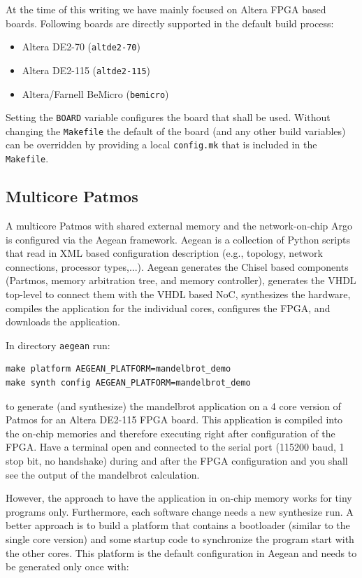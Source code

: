 \documentclass[a4paper,fontsize=10pt,twoside,DIV15,BCOR12mm,headinclude=true,footinclude=false,pagesize,bibtotoc]{scrbook}
\newcommand{\code}[1]{{\texttt{#1}}}
\begin{document}
At the time of this writing we have mainly focused on Altera FPGA based boards. Following boards
are directly supported in the default build process:

\begin{itemize}
\item Altera DE2-70 (\code{altde2-70})
\item Altera DE2-115 (\code{altde2-115})
\item Altera/Farnell BeMicro (\code{bemicro})
\end{itemize}

Setting the \code{BOARD} variable configures the board that shall be used.
Without changing the \code{Makefile} the default of the board (and any other build variables)
can be overridden by providing a local \code{config.mk} that is included in the \code{Makefile}.

\subsection{Multicore Patmos}

A multicore Patmos with shared external memory and the network-on-chip Argo is configured via
the Aegean framework. Aegean is a collection of Python scripts that read in XML based configuration
description (e.g., topology, network connections, processor types,...). Aegean generates the Chisel based
components (Partmos, memory arbitration tree, and memory controller), generates the VHDL top-level
to connect them with the VHDL based NoC, synthesizes the hardware, compiles the application for the
individual cores, configures the FPGA, and downloads the application.

In directory \code{aegean} run:

\begin{verbatim}
make platform AEGEAN_PLATFORM=mandelbrot_demo
make synth config AEGEAN_PLATFORM=mandelbrot_demo
\end{verbatim}

to generate (and synthesize) the mandelbrot application on a 4 core
version of Patmos for an Altera DE2-115 FPGA board. This application is compiled
into the on-chip memories and therefore executing right after configuration of the
FPGA. Have a terminal open and connected to the serial port (115200 baud, 1 stop bit,
no handshake) during and after the FPGA configuration and you shall see the output of
the mandelbrot calculation.

However, the approach to have the application in on-chip memory works for tiny programs
only. Furthermore, each software change needs a new synthesize run. A better approach is
to build a platform that contains a bootloader (similar to the single core version) and some
startup code to synchronize the program start with the other cores. This platform is the default
configuration in Aegean and needs to be generated only once with:
\end{document}
